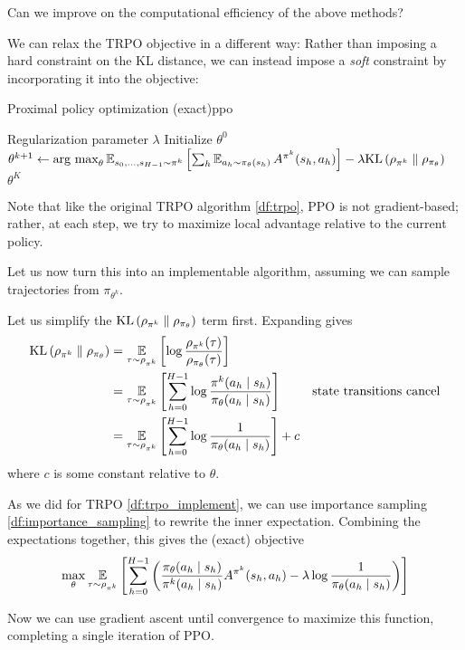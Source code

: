 \documentclass[\main/main]{subfiles}
\begin{document}
Can we improve on the computational efficiency of the above methods?


We can relax the TRPO objective in a different way: Rather than imposing a hard constraint on the KL distance, we can instead impose a \emph{soft} constraint by incorporating it into the objective:


\begin{definition}{Proximal policy optimization (exact)}{ppo}
    \begin{algorithmic}
        \Require Regularization parameter $\lambda$
        \State Initialize $\theta^0$
        \State $\theta^{k+1} \gets \operatorname*{\textrm{arg\ max}}_{\theta} \operatorname*{\mathbb{E}}_{s_0, \dots, s_{H-1} \sim \pi^k} \left[ \sum_h \operatorname*{\mathbb{E}}_{a_h \sim \pi_\theta(s_h)} A^{\pi^k}(s_h, a_h) \right] - \lambda \mathrm{KL}\left(\rho_{\pi^k} \parallel \rho_{\pi_{\theta}}\right)$
        \EndFor
        \State \Return $\theta^K$
    \end{algorithmic}

    Note that like the original TRPO algorithm \ref{df:trpo}, PPO is not gradient-based; rather, at each step, we try to maximize local advantage relative to the current policy.
\end{definition}

Let us now turn this into an implementable algorithm, assuming we can sample trajectories from $\pi_{\theta^k}$.


Let us simplify the $\mathrm{KL}\left(\rho_{\pi^k} \parallel \rho_{\pi_{\theta}}\right)$ term first. Expanding gives
\begin{align*}
    \mathrm{KL}\left(\rho_{\pi^k} \parallel \rho_{\pi_{\theta}}\right) & = \operatorname*{\mathbb{E}}_{\tau \sim \rho_{\pi^k}} \left[\log \frac{\rho_{\pi^k}(\tau)}{\rho_{\pi_{\theta}}(\tau)}\right]                                                       \\
                                           & = \operatorname*{\mathbb{E}}_{\tau \sim \rho_{\pi^k}} \left[ \sum_{h=0}^{H-1} \log \frac{\pi^k(a_h \mid s_h)}{\pi_{\theta}(a_h \mid s_h)}\right] & \text{state transitions cancel} \\
                                           & = \operatorname*{\mathbb{E}}_{\tau \sim \rho_{\pi^k}} \left[ \sum_{h=0}^{H-1} \log \frac{1}{\pi_{\theta}(a_h \mid s_h)}\right] + c
\end{align*}
where $c$ is some constant relative to $\theta$.

As we did for TRPO \eqref{df:trpo_implement}, we can use importance sampling \eqref{df:importance_sampling} to rewrite the inner expectation.
Combining the expectations together, this gives the (exact) objective
\[
    \max_{\theta} \operatorname*{\mathbb{E}}_{\tau \sim \rho_{\pi^k}} \left[ \sum_{h=0}^{H-1} \left( \frac{\pi_\theta(a_h \mid s_h)}{\pi^k(a_h \mid s_h)} A^{\pi^k}(s_h, a_h) - \lambda \log \frac{1}{\pi_\theta(a_h \mid s_h)} \right) \right]
\]

Now we can use gradient ascent until convergence to maximize this function, completing a single iteration of PPO.
\end{document}
